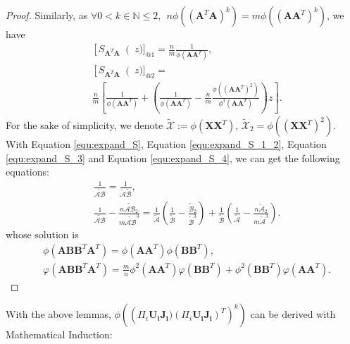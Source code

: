 \documentclass[10pt,journal,compsoc]{IEEEtran}
\begin{document}
\begin{proof}
Similarly, as $\forall 0<k\in \mathbb{N}\le 2,~~n\phi\left((\mathbf{A}^T\mathbf{A})^k\right)=m\phi\left((\mathbf{AA}^T)^k\right)$, we have
\begin{equation}
\begin{split}
    & \left[S_{\mathbf{A}^T\mathbf{A}}\right(z)]_{@1}=\frac{n}{m}\frac{1}{\phi(\mathbf{AA}^T)},\\
    & \left[S_{\mathbf{A}^T\mathbf{A}}\right(z)]_{@2} = \\
    & \frac{n}{m}\left[\frac{1}{\phi(\mathbf{AA}^T)} + \left(\frac{1}{\phi(\mathbf{AA}^T)} - \frac{n}{m} \frac{\phi\left((\mathbf{AA}^T)^2\right)}{\phi^3(\mathbf{AA}^T)}\right)z\right].
\end{split}
\label{equ:expand_S_4}
\end{equation}
For the sake of simplicity, we denote $\widetilde{\mathcal{X}}:=\phi(\mathbf{XX}^T)$, $\widetilde{\mathcal{X}}_2 = \phi\left((\mathbf{XX}^T)^2\right)$. With Equation \eqref{equ:expand_S}, Equation \eqref{equ:expand_S_1_2}, Equation \eqref{equ:expand_S_3} and Equation \eqref{equ:expand_S_4}, we can get the following equations:
\begin{equation}
    \begin{split}
        &\frac{1}{\widetilde{\mathcal{AB}}} = \frac{1}{\widetilde{\mathcal{A}}\widetilde{\mathcal{B}}},\\
        &\frac{1}{\widetilde{\mathcal{AB}}} - \frac{n\widetilde{\mathcal{AB}}_2}{m\widetilde{\mathcal{AB}}^3} = \frac{1}{\widetilde{\mathcal{A}}}\left(\frac{1}{\widetilde{\mathcal{B}}} - \frac{\widetilde{\mathcal{B}}_2}{\widetilde{\mathcal{B}}^3}\right) + \frac{1}{\widetilde{\mathcal{B}}}\left(\frac{1}{\widetilde{\mathcal{A}}} - \frac{n\widetilde{\mathcal{A}}_2}{m\widetilde{\mathcal{A}}^3}\right).
    \end{split}
\end{equation}
whose solution is
\begin{equation}
\begin{split}
    & \phi(\mathbf{ABB}^T\mathbf{A}^T) = \phi(\mathbf{AA}^T)\phi(\mathbf{BB}^T),\\
    & \varphi(\mathbf{ABB}^T\mathbf{A}^T) = \frac{m}{n}\phi^2(\mathbf{AA}^T)\varphi(\mathbf{BB}^T)\! +\! \phi^2(\mathbf{BB}^T)\varphi(\mathbf{AA}^T).
\end{split}
\end{equation}
\end{proof}

With the above lemmas, $\phi\left(\left(\Pi_{i}\mathbf{U_iJ_i})(\Pi_{i}\mathbf{U_iJ_i})^T\right)^k\right)$ can be derived with Mathematical Induction:
\end{document}
